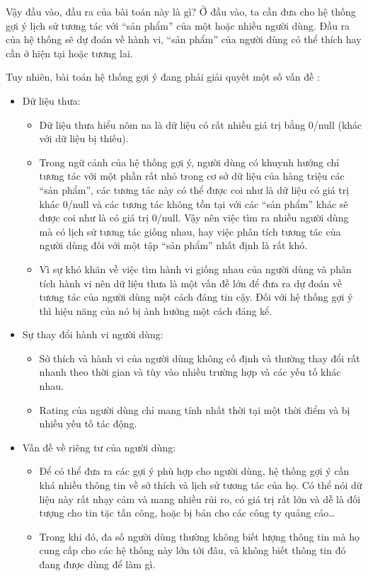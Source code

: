 \documentclass{article}[14pt]
\begin{document}
    Vậy đầu vào, đầu ra của bài toán này là gì? Ở đầu vào, ta cần đưa cho hệ thống gợi ý lịch sử tương tác với “sản phẩm” của một hoặc nhiều người dùng. Đầu ra của hệ thống sẽ dự đoán về hành vi, “sản phẩm” của người dùng có thể thích hay cần ở hiện tại hoặc tương lai.
    
    Tuy nhiên, bài toán hệ thống gợi ý đang phải giải quyết một số vấn đề \cite{issues}:
    \begin{itemize}[leftmargin=10mm]
        \item Dữ liệu thưa:
            \begin{itemize}
                \item Dữ liệu thưa hiểu nôm na là dữ liệu có rất nhiều giá trị bằng 0/null (khác với dữ liệu bị thiếu).
                \item Trong ngữ cảnh của hệ thống gợi ý, người dùng có khuynh hướng chỉ tương tác với một phần rất nhỏ trong cơ sở dữ liệu của hàng triệu các “sản phẩm”, các tương tác này có thể được coi như là dữ liệu có giá trị khác 0/null và các tương tác không tồn tại với các “sản phẩm” khác sẽ được coi như là có giá trị 0/null. Vậy nên việc tìm ra nhiều người dùng mà có lịch sử tương tác giống nhau, hay việc phân tích tương tác của người dùng đối với một tập “sản phẩm” nhất định là rất khó.
                \item Vì sự khó khăn về việc tìm hành vi giống nhau của người dùng và phân tích hành vi nên dữ liệu thưa là một vấn đề lớn để đưa ra dự đoán về tương tác của người dùng một cách đáng tin cậy. Đối với hệ thống gợi ý thì hiệu năng của nó bị ảnh hưởng một cách đáng kể.
            \end{itemize}
        \item Sự thay đổi hành vi người dùng:
            \begin{itemize}
                \item Sở thích và hành vi của người dùng không cố định và thường thay đổi rất nhanh theo thời gian và tùy vào nhiều trường hợp và các yếu tố khác nhau.
                \item Rating của người dùng chỉ mang tính nhất thời tại một thời điểm và bị nhiều yếu tố tác động.
            \end{itemize}
        \item Vấn đề về riêng tư của người dùng:
            \begin{itemize}
                \item Để có thể đưa ra các gợi ý phù hợp cho người dùng, hệ thống gợi ý cần khá nhiều thông tin về sở thích và lịch sử tương tác của họ. Có thể nói dữ liệu này rất nhạy cảm và mang nhiều rủi ro, có giá trị rất lớn và dễ là đối tượng cho tin tặc tấn công, hoặc bị bán cho các công ty quảng cáo…
                \item Trong khi đó, đa số người dùng thường không biết lượng thông tin mà họ cung cấp cho các hệ thống này lớn tới đâu, và không biết thông tin đó đang được dùng để làm gì.
            \end{itemize}
    \end{itemize}
\end{document}
